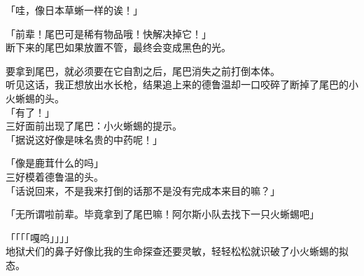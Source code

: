 「哇，像日本草蜥一样的诶！」

「前辈！尾巴可是稀有物品哦！快解决掉它！」\\

断下来的尾巴如果放置不管，最终会变成黑色的光。

要拿到尾巴，就必须要在它自割之后，尾巴消失之前打倒本体。\\

听见这话，我正想放出水长枪，结果追上来的德鲁温却一口咬碎了断掉了尾巴的小火蜥蜴的头。\\

「有了！」\\

三好面前出现了尾巴：小火蜥蜴的提示。\\

「据说这好像是味名贵的中药呢！」

「像是鹿茸什么的吗」\\

三好模着德鲁温的头。\\

「话说回来，不是我来打倒的话那不是没有完成本来目的嘛？」

「无所谓啦前辈。毕竟拿到了尾巴嘛！阿尔斯小队去找下一只火蜥蜴吧」

「「「「嘎呜」」」」\\

地狱犬们的鼻子好像比我的生命探查还要灵敏，轻轻松松就识破了小火蜥蜴的拟态。

